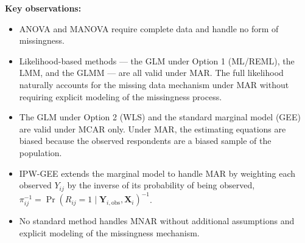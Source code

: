 \documentclass[11pt]{article}
\newcommand{\bY}{\mathbf{Y}}
\newcommand{\bX}{\mathbf{X}}
\begin{document}
\vspace{1em}

\textbf{Key observations:}
\begin{itemize}[leftmargin=2em]
  \item ANOVA and MANOVA require complete data and handle no form of missingness.
  \item Likelihood-based methods --- the GLM under Option 1 (ML/REML), the LMM, and the GLMM --- are all valid under MAR. The full likelihood naturally accounts for the missing data mechanism under MAR without requiring explicit modeling of the missingness process.
  \item The GLM under Option 2 (WLS) and the standard marginal model (GEE) are valid under MCAR only. Under MAR, the estimating equations are biased because the observed respondents are a biased sample of the population.
  \item IPW-GEE extends the marginal model to handle MAR by weighting each observed $Y_{ij}$ by the inverse of its probability of being observed, $\pi_{ij}^{-1} = \Pr(R_{ij} = 1 \mid \bY_{i,\text{obs}}, \bX_i)^{-1}$.
  \item No standard method handles MNAR without additional assumptions and explicit modeling of the missingness mechanism.
\end{itemize}
\end{document}
